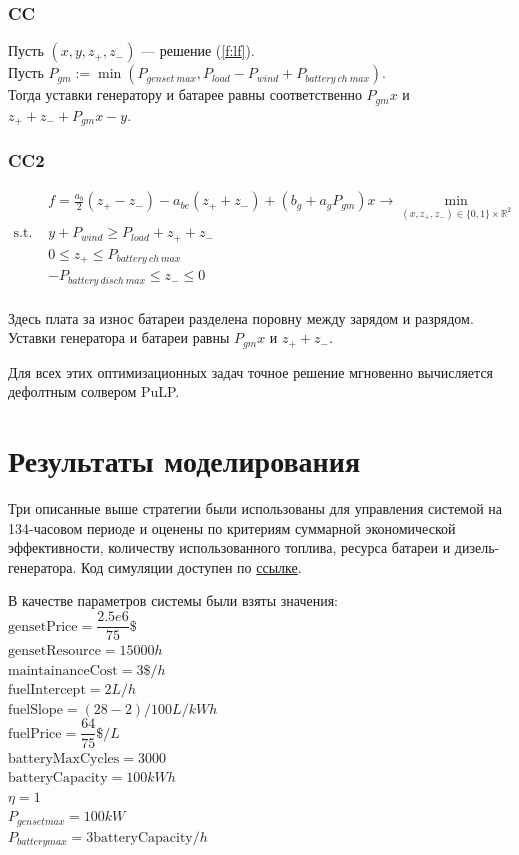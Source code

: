 \documentclass{report}
\def \R {\mathbb{R}}
\begin{document}
\subsubsection{CC}
Пусть $(x, y, z_+, z_-)$ --- решение (\ref{f:lf}).\\
Пусть $P_{gm} := \min(P_{genset~max}, P_{load}- P_{wind} + P_{battery~ch~max})$.\\
Тогда уставки генератору и батарее равны соответственно $P_{gm}x$ и $z_+ + z_- + P_{gm}x - y$.

\subsubsection{CC2}

\begin{equation}\label{f:cc2}
\begin{split}
&f = \frac{a_b}{2}(z_+ - z_-) - a_{be}(z_+ + z_-)
+ (b_g  + a_g P_{gm}) x
\rightarrow \min\limits_{(x, z_+, z_-) \in \{0,1\} \times \R^2 }\\
\text{s.t. }& y + P_{wind} \geq P_{load} + z_+ + z_-\\
&0 \leq z_+ \leq P_{battery~ch~max} \\
&-P_{battery~disch~max} \leq z_- \leq 0 \\
\end{split}
\end{equation}


Здесь плата за износ батареи разделена поровну между зарядом и разрядом.
Уставки генератора и батареи равны $P_{gm}x$ и $z_+ + z_-$.

\medskip
Для всех этих оптимизационных задач точное решение мгновенно вычисляется дефолтным солвером PuLP.

\section{Результаты моделирования}
Три описанные выше стратегии были использованы для управления системой на 134-часовом периоде и оценены по критериям суммарной экономической эффективности, количеству использованного топлива,  ресурса батареи и дизель-генератора.
Код симуляции доступен по \href{https://github.com/niquepolice/electro/blob/03f136b13663806bfba4a4ce973f524558564363/milp.ipynb}{ссылке}.

В качестве параметров системы были взяты значения:\\
$\text{gensetPrice} = \dfrac{2.5e6}{75}\$$\\
$\text{gensetResource} = 15000h$\\
$\text{maintainanceCost} = 3\$/h$\\
$\text{fuelIntercept} = 2L/h$\\
$\text{fuelSlope} = (28-2)/100 L/kWh$\\
$\text{fuelPrice} = \dfrac{64}{75}\$/L$\\
$\text{batteryMaxCycles} = 3000$\\
$\text{batteryCapacity} = 100kWh$\\
$\eta = 1$ \\
$P_{genset max} = 100kW$ \\
$P_{battery max} = 3\text{batteryCapacity} / h$
\end{document}
